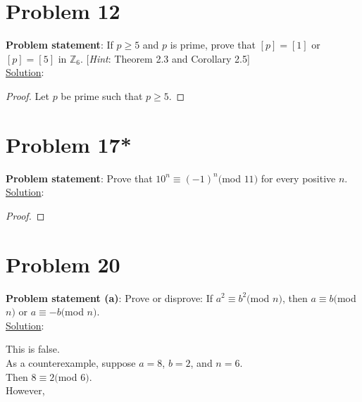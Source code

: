 \documentclass{article} %
\begin{document}
\newpage

\section*{Problem 12}


\textbf{Problem statement}: If $p \geq 5$ and $p$ is prime, prove that $[p] = [1]$ or $[p] = [5]$ in $\mathbb{Z}_6$. [\textit{Hint}: Theorem 2.3 and Corollary 2.5]
\\

\underline{Solution}: 
\begin{addmargin}[1em]{0em}
\begin{proof}
Let $p$ be prime such that $p \geq 5$.
\end{proof}
\end{addmargin}

\newpage

\section*{Problem 17*}


\textbf{Problem statement}: Prove that $10^n \equiv (-1)^n($mod $ 11)$ for every positive $n$.
\\

\underline{Solution}: 
\begin{addmargin}[1em]{0em}
\begin{proof}

\end{proof}
\end{addmargin}

\newpage

\section*{Problem 20}


\textbf{Problem statement (a)}: Prove or disprove: If $a^2 \equiv b^2 ($mod $n)$, then $a \equiv b($mod $ n)$ or $a \equiv -b($mod $n)$. 
\\

\underline{Solution}: 
\begin{addmargin}[1em]{0em}
This is false.
\\As a counterexample, suppose $a = 8$, $b = 2$, and $n = 6$.
\\Then $8 \equiv 2 ($mod $ 6)$.
\\However,
\end{addmargin}
\end{document}
